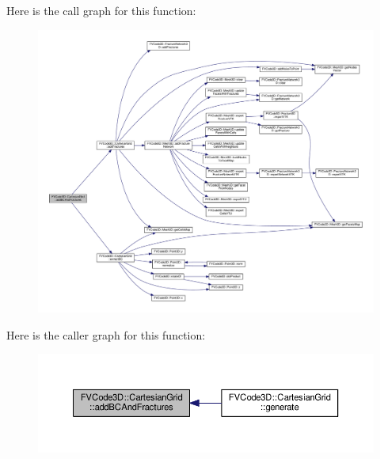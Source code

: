 Here is the call graph for this function\+:
\nopagebreak
\begin{figure}[H]
\begin{center}
\leavevmode
\includegraphics[width=350pt]{classFVCode3D_1_1CartesianGrid_ac8dc7df2cf0ff329b495db228c58002b_cgraph}
\end{center}
\end{figure}




Here is the caller graph for this function\+:
\nopagebreak
\begin{figure}[H]
\begin{center}
\leavevmode
\includegraphics[width=350pt]{classFVCode3D_1_1CartesianGrid_ac8dc7df2cf0ff329b495db228c58002b_icgraph}
\end{center}
\end{figure}


